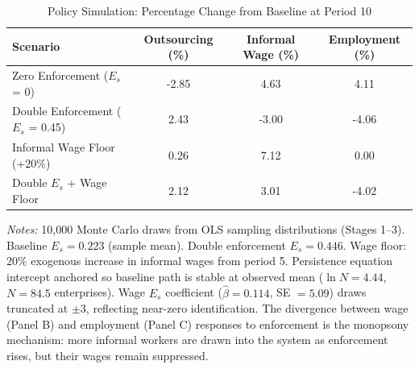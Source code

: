 \begin{table}[ht]
  \centering
  \caption{Policy Simulation: Percentage Change from Baseline at Period 10}
  \label{tab:policy_simulation}
  \small
  \begin{tabular}{lccc}
    \toprule
    Scenario & Outsourcing (\%) & Informal Wage (\%) & Employment (\%) \\
    \midrule
    Zero Enforcement ($E_s$ = 0) & -2.85 & 4.63 & 4.11 \\
    Double Enforcement ($E_s$ = 0.45) & 2.43 & -3.00 & -4.06 \\
    Informal Wage Floor (+20\%) & 0.26 & 7.12 & 0.00 \\
    Double $E_s$ + Wage Floor & 2.12 & 3.01 & -4.02 \\
    \bottomrule
  \end{tabular}
  \medskip
  \begin{minipage}{\linewidth}\footnotesize
    \textit{Notes:} 10,000 Monte Carlo draws from OLS sampling
    distributions (Stages 1--3). Baseline $E_s = 0.223$ (sample mean).
    Double enforcement $E_s = 0.446$. Wage floor: 20\% exogenous
    increase in informal wages from period 5.
    Persistence equation intercept anchored so baseline path is stable at
    observed mean ($\ln N = 4.44$, $N = 84.5$ enterprises).
    Wage $E_s$ coefficient ($\hat{\beta} = 0.114$, SE $= 5.09$)
    draws truncated at $\pm 3$, reflecting near-zero identification.
    The divergence between wage (Panel B) and employment (Panel C)
    responses to enforcement is the monopsony mechanism:
    more informal workers are drawn into the system as enforcement rises,
    but their wages remain suppressed.
  \end{minipage}
\end{table}
